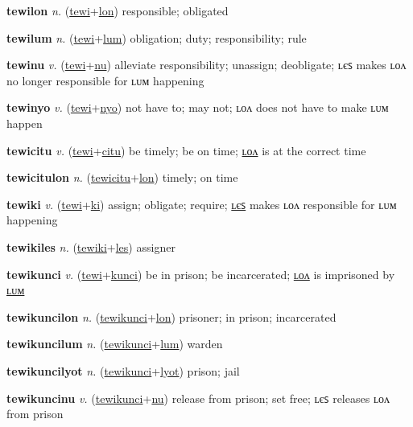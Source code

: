\textbf{\hypertarget{tewilon}{tewilon}} \textit{n.} (\hyperlink{tewi}{tewi}+\allowbreak \hyperlink{lon}{lon})
responsible; obligated

\textbf{\hypertarget{tewilum}{tewilum}} \textit{n.} (\hyperlink{tewi}{tewi}+\allowbreak \hyperlink{lum}{lum})
obligation; duty; responsibility; rule

\textbf{\hypertarget{tewinu}{tewinu}} \textit{v.} (\hyperlink{tewi}{tewi}+\allowbreak \hyperlink{nu}{nu})
alleviate responsibility; unassign; deobligate; ʟєꜱ makes ʟᴏᴧ no longer responsible for ʟᴜᴍ happening

\textbf{\hypertarget{tewinyo}{tewinyo}} \textit{v.} (\hyperlink{tewi}{tewi}+\allowbreak \hyperlink{nyo}{nyo})
not have to; may not; ʟᴏᴧ does not have to make ʟᴜᴍ happen

\textbf{\hypertarget{tewicitu}{tewicitu}} \textit{v.} (\hyperlink{tewi}{tewi}+\allowbreak \hyperlink{citu}{citu})
be timely; be on time; \hyperlink{tewicitulon}{ʟᴏᴧ} is at the correct time

\textbf{\hypertarget{tewicitulon}{tewicitulon}} \textit{n.} (\hyperlink{tewicitu}{tewicitu}+\allowbreak \hyperlink{lon}{lon})
timely; on time

\textbf{\hypertarget{tewiki}{tewiki}} \textit{v.} (\hyperlink{tewi}{tewi}+\allowbreak \hyperlink{ki}{ki})
assign; obligate; require; \hyperlink{tewikiles}{ʟєꜱ} makes ʟᴏᴧ responsible for ʟᴜᴍ happening

\textbf{\hypertarget{tewikiles}{tewikiles}} \textit{n.} (\hyperlink{tewiki}{tewiki}+\allowbreak \hyperlink{les}{les})
assigner

\textbf{\hypertarget{tewikunci}{tewikunci}} \textit{v.} (\hyperlink{tewi}{tewi}+\allowbreak \hyperlink{kunci}{kunci})
be in prison; be incarcerated; \hyperlink{tewikuncilon}{ʟᴏᴧ} is imprisoned by \hyperlink{tewikuncilum}{ʟᴜᴍ}

\textbf{\hypertarget{tewikuncilon}{tewikuncilon}} \textit{n.} (\hyperlink{tewikunci}{tewikunci}+\allowbreak \hyperlink{lon}{lon})
prisoner; in prison; incarcerated

\textbf{\hypertarget{tewikuncilum}{tewikuncilum}} \textit{n.} (\hyperlink{tewikunci}{tewikunci}+\allowbreak \hyperlink{lum}{lum})
warden

\textbf{\hypertarget{tewikuncilyot}{tewikuncilyot}} \textit{n.} (\hyperlink{tewikunci}{tewikunci}+\allowbreak \hyperlink{lyot}{lyot})
prison; jail

\textbf{\hypertarget{tewikuncinu}{tewikuncinu}} \textit{v.} (\hyperlink{tewikunci}{tewikunci}+\allowbreak \hyperlink{nu}{nu})
release from prison; set free; ʟєꜱ releases ʟᴏᴧ from prison

